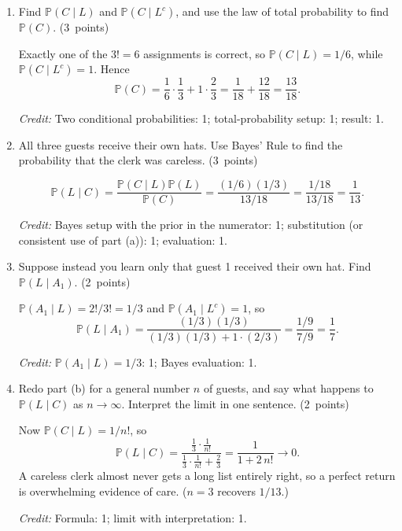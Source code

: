 \documentclass[11pt,letterpaper]{article}
\newcommand{\Prob}{\mathbb P}
\newcommand{\partpts}[1]{\unskip\nobreak\hspace{.3em}%
  \mbox{\small\color{muted}(#1 points)}}
\newcommand{\credit}[1]{\par{\footnotesize\color{muted}\textit{Credit:} #1}}
\begin{document}
\begin{enumerate}
  \item Find $\Prob(C\mid L)$ and $\Prob(C\mid L^c)$, and use the law of total
  probability to find $\Prob(C)$. \partpts{3}
  \begin{solution}[1.1in]
    Exactly one of the $3!=6$ assignments is correct, so $\Prob(C\mid L)=1/6$,
    while $\Prob(C\mid L^c)=1$. Hence
    \[
      \Prob(C)=\frac16\cdot\frac13+1\cdot\frac23=\frac1{18}+\frac{12}{18}
      =\frac{13}{18}.
    \]
    \credit{Two conditional probabilities: 1; total-probability setup: 1;
    result: 1.}
  \end{solution}

  \item All three guests receive their own hats. Use Bayes' Rule to find
  the probability that the clerk was careless. \partpts{3}
  \begin{solution}[1.1in]
    \[
      \Prob(L\mid C)=\frac{\Prob(C\mid L)\Prob(L)}{\Prob(C)}
      =\frac{(1/6)(1/3)}{13/18}=\frac{1/18}{13/18}=\frac1{13}.
    \]
    \credit{Bayes setup with the prior in the numerator: 1; substitution (or
    consistent use of part (a)): 1; evaluation: 1.}
  \end{solution}

  \item Suppose instead you learn only that guest 1 received their own hat.
  Find $\Prob(L\mid A_1)$. \partpts{2}
  \begin{solution}[1.1in]
    $\Prob(A_1\mid L)=2!/3!=1/3$ and $\Prob(A_1\mid L^c)=1$, so
    \[
      \Prob(L\mid A_1)=\frac{(1/3)(1/3)}{(1/3)(1/3)+1\cdot(2/3)}
      =\frac{1/9}{7/9}=\frac17.
    \]
    \credit{$\Prob(A_1\mid L)=1/3$: 1; Bayes evaluation: 1.}
  \end{solution}

  \item Redo part (b) for a general number $n$ of guests, and say what happens
  to $\Prob(L\mid C)$ as $n\to\infty$. Interpret the limit in one sentence.
  \partpts{2}
  \begin{solution}[1.2in]
    Now $\Prob(C\mid L)=1/n!$, so
    \[
      \Prob(L\mid C)=\frac{\frac13\cdot\frac1{n!}}
        {\frac13\cdot\frac1{n!}+\frac23}=\frac1{1+2\,n!}\longrightarrow0 .
    \]
    A careless clerk almost never gets a long list entirely right, so a
    perfect return is overwhelming evidence of care. ($n=3$ recovers $1/13$.)
    \credit{Formula: 1; limit with interpretation: 1.}
  \end{solution}
\end{enumerate}

\label{quiz-last-page}
\end{document}
